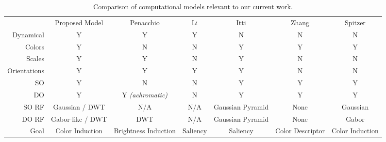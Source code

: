 \documentclass[journal,onecolumn]{IEEEtran}
\begin{document}
\begin{table}[H] \label{tab:model-comparison}
    \centering
    \caption{Comparison of computational models relevant to our current work.}
    \begin{threeparttable}
    \begin{tabular}{rcccccc}
        \multicolumn{1}{r|}{}             & Proposed Model   & Penacchio \cite{penacchio:2013} & Li \cite{li:1999} & Itti \cite{itti:1998} & Zhang \cite{zhang:2012} & Spitzer \cite{spitzer:2005} \\ \cline{1-7}
        \multicolumn{1}{r|}{Dynamical}    & Y                & Y                               & Y                 & N                     & N                       & N               \\
        \multicolumn{1}{r|}{Colors}       & Y                & N                               & N                 & Y                     & Y                       & Y               \\
        \multicolumn{1}{r|}{Scales}       & Y                & Y                               & N                 & Y                     & N                       & N               \\
        \multicolumn{1}{r|}{Orientations} & Y                & Y                               & Y                 & Y                     & N                       & N               \\
        \multicolumn{1}{r|}{SO}           & Y                & N                               & N                 & Y                     & Y                       & Y               \\
        \multicolumn{1}{r|}{DO}           & Y                & Y \textit{(achromatic)}         & N                 & Y                     & Y                       & Y               \\
        \multicolumn{1}{r|}{SO RF}        & Gaussian / DWT   & N/A                             & N/A               & Gaussian Pyramid      & None                    & Gaussian        \\
        \multicolumn{1}{r|}{DO RF}        & Gabor-like / DWT & DWT                             & N/A               & Gaussian Pyramid      & None                    & Gabor           \\
        \multicolumn{1}{r|}{Goal}         & Color Induction  & Brightness Induction            & Saliency          & Saliency              & Color Descriptor        & Color Induction
    \end{tabular}

\end{threeparttable}
\end{table}
\end{document}
